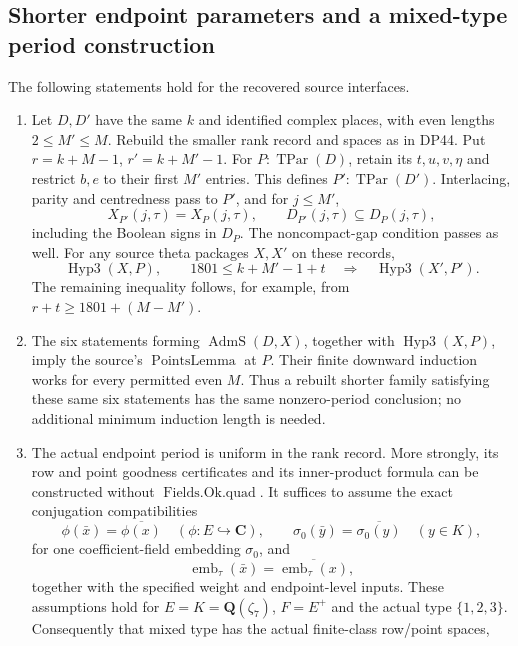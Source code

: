 \subsection{Shorter endpoint parameters and a mixed-type period construction}

\begin{proposition}\label{DP52}
The following statements hold for the recovered source interfaces.
\begin{enumerate}[label=(\alph*),leftmargin=*]
\item Let $D,D'$ have the same $k$ and identified complex places, with even lengths
$2\le M'\le M$. Rebuild the smaller rank record and spaces as in DP44.
Put $r=k+M-1$, $r'=k+M'-1$.
For $P:\operatorname{TPar}(D)$, retain its $t,u,v,\eta$ and restrict $b,e$ to
their first $M'$ entries. This defines $P':\operatorname{TPar}(D')$.
Interlacing, parity and centredness pass to $P'$, and for $j\le M'$,
\[
 X_{P'}(j,\tau)=X_P(j,\tau),\qquad
 D_{P'}(j,\tau)\subseteq D_P(j,\tau),
\]
including the Boolean signs in $D_P$.
The noncompact-gap condition passes as well.
For any source theta packages $X,X'$ on these records,
\[
 \operatorname{Hyp3}(X,P),\qquad 1801\le k+M'-1+t
 \quad\Longrightarrow\quad \operatorname{Hyp3}(X',P').
\]
The remaining inequality follows, for example, from
$r+t\ge1801+(M-M')$.
\item The six statements forming $\operatorname{AdmS}(D,X)$, together with
$\operatorname{Hyp3}(X,P)$, imply the source's $\operatorname{PointsLemma}$
at $P$. Their finite downward induction works for every permitted even $M$.
Thus a rebuilt shorter family satisfying these same six statements has the
same nonzero-period conclusion; no additional minimum induction length is
needed.
\item The actual endpoint period is uniform in the rank record.
More strongly, its row and point goodness certificates and its inner-product
formula can be constructed without $\operatorname{Fields.Ok.quad}$.
It suffices to assume the exact conjugation compatibilities
\[
 \phi(\bar x)=\overline{\phi(x)}
       \quad(\phi:E\hookrightarrow\mathbf C),\qquad
 \sigma_0(\bar y)=\overline{\sigma_0(y)}
       \quad(y\in K),
\]
for one coefficient-field embedding $\sigma_0$, and
\[
 \operatorname{emb}_\tau(\bar x)
       =\overline{\operatorname{emb}_\tau(x)},
\]
together with the specified weight and endpoint-level inputs.
These assumptions hold for $E=K=\mathbf Q(\zeta_7)$,
$F=E^+$ and the actual type $\{1,2,3\}$.
Consequently that mixed type has the actual finite-class row/point spaces,

\end{enumerate}
\end{proposition}
